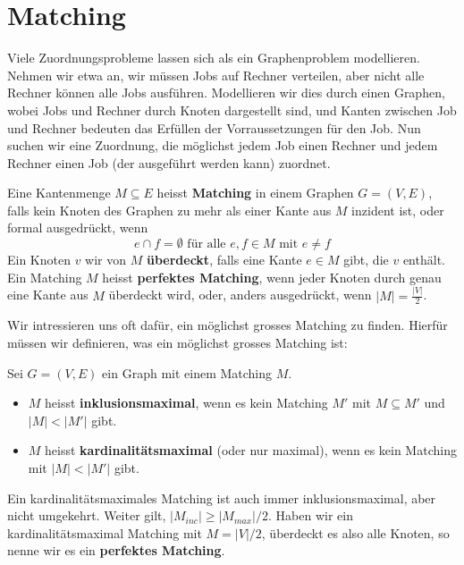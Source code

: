 \chapter{Matching}

Viele Zuordnungsprobleme lassen sich als ein Graphenproblem modellieren. Nehmen wir etwa an, wir müssen 
Jobs auf Rechner verteilen, aber nicht alle Rechner können alle Jobs ausführen. Modellieren wir dies durch 
einen Graphen, wobei Jobs und Rechner durch Knoten dargestellt sind, und Kanten zwischen Job und Rechner 
bedeuten das Erfüllen der Vorraussetzungen für den Job. Nun suchen wir eine Zuordnung, die möglichst jedem 
Job einen Rechner und jedem Rechner einen Job (der ausgeführt werden kann) zuordnet.

\begin{definition}
    Eine Kantenmenge $M \subseteq E$ heisst \textbf{Matching} in einem Graphen $G = (V,E)$, falls kein
    Knoten des Graphen zu mehr als einer Kante aus $M$ inzident ist, oder formal ausgedrückt, wenn
    $$e \cap f = \emptyset \text{    für alle    } e,f \in M \text{    mit    } e \neq f$$
    Ein Knoten $v$ wir von $M$ \textbf{überdeckt}, falls eine Kante $e \in M$ gibt, die $v$ enthält. \\

    Ein Matching $M$ heisst \textbf{perfektes Matching}, wenn jeder Knoten durch genau eine Kante aus
    $M$ überdeckt wird, oder, anders ausgedrückt, wenn $|M| = \frac{|V|}{2} $.
\end{definition}
\bigskip

Wir intressieren uns oft dafür, ein möglichst grosses Matching zu finden. Hierfür müssen wir definieren, was ein
möglichst grosses Matching ist:

\begin{definition}
    Sei $G = (V,E)$ ein Graph mit einem Matching $M$.
    \begin{itemize}
        \item $M$ heisst \textbf{inklusionsmaximal}, wenn es kein Matching $M'$ mit $M \subseteq M'$ und $|M| < |M'|$ gibt.
        \item $M$ heisst \textbf{kardinalitätsmaximal} (oder nur maximal), wenn es kein Matching mit $|M| < |M'|$ gibt.
    \end{itemize}
    Ein kardinalitätsmaximales Matching ist auch immer inklusionsmaximal, aber nicht umgekehrt. Weiter gilt,
    $|M_{inc}| \geq |M_{max}| / 2$. Haben wir ein kardinalitätsmaximal Matching mit $M = |V| / 2$, überdeckt es also alle
    Knoten, so nenne wir es ein \textbf{perfektes Matching}.
\end{definition}

